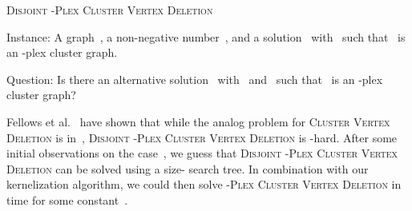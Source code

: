 \documentclass[12pt, a4paper, abstracton]{scrreprt}
\renewcommand{\cite}{~\citep}
\newcommand{\name}{\textsc}
\newcommand{\pvd}[1]{\name{\mbox{-Plex} Cluster Vertex Deletion}}
\newcommand{\cvd}{\name{Cluster Vertex Deletion}}
\newcommand{\pl}[1]{\mbox{-plex}}
\newcommand{\pcg}[1]{\pl #1 cluster graph}
\newcommand{\decprob}[3]{\begin{flushright}
\addtolength{\linewidth}{-1em}
\begin{minipage}{\linewidth}
\textsc{#1}
\begin{compactdesc}
\item[\hspace{\parindent}Instance:] #2
\item[\hspace{\parindent}Question:] #3
\end{compactdesc}  
\end{minipage}
\addtolength{\linewidth}{1em}
\end{flushright}
}
\theoremstyle{definition}
\theoremstyle{remark}
\begin{document}
\decprob{\textsc{Disjoint} \pvd s}{A graph~, a non-negative number~, and a solution~ with~ such that~ is an \pcg s.}{Is there an alternative solution~ with~ and~ such that~ is an \pcg s?}

\noindent Fellows et al.\cite{DBLP:conf/mfcs/FellowsGMN09} have shown that while the analog problem for \cvd{} is in~, \textsc{Disjoint} \pvd s is -hard.  After some initial observations on the case~, we guess that \textsc{Disjoint} \pvd 2 can be solved using a size- search tree. In combination with our kernelization algorithm, we could then solve \pvd 2 in~ time for some constant~.


{}
\end{document}
